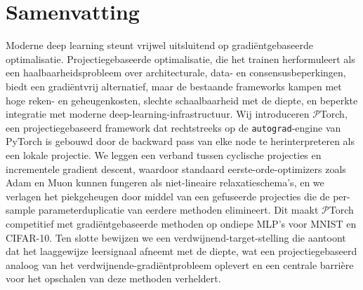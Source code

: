 \documentclass[master=ai,openany]{kulemt}
\begin{document}
\chapter{Samenvatting}
Moderne deep learning steunt vrijwel uitsluitend op gradiëntgebaseerde optimalisatie. Projectiegebaseerde optimalisatie, die het trainen herformuleert als een haalbaarheidsprobleem over architecturale, data- en consensusbeperkingen, biedt een gradiëntvrij alternatief, maar de bestaande frameworks kampen met hoge reken- en geheugenkosten, slechte schaalbaarheid met de diepte, en beperkte integratie met moderne deep-learning-infrastructuur. Wij introduceren $\mathcal{P}$Torch, een projectiegebaseerd framework dat rechtstreeks op de \texttt{autograd}-engine van PyTorch is gebouwd door de backward pass van elke node te herinterpreteren als een lokale projectie. We leggen een verband tussen cyclische projecties en incrementele gradient descent, waardoor standaard eerste-orde-optimizers zoals Adam en Muon kunnen fungeren als niet-lineaire relaxatieschema's, en we verlagen het piekgeheugen door middel van een gefuseerde projecties die de per-sample parameterduplicatie van eerdere methoden elimineert. Dit maakt $\mathcal{P}
$Torch competitief met gradiëntgebaseerde methoden op ondiepe MLP's voor MNIST en CIFAR-10. Ten slotte bewijzen we een verdwijnend-target-stelling die aantoont dat het laaggewijze leersignaal afneemt met de diepte, wat een projectiegebaseerd analoog van het verdwijnende-gradiëntprobleem oplevert en een centrale barrière voor het opschalen van deze methoden verheldert.
\listoffiguresandtables

\mainmatter






\appendixpage*
\appendix







\backmatter



\end{document}
